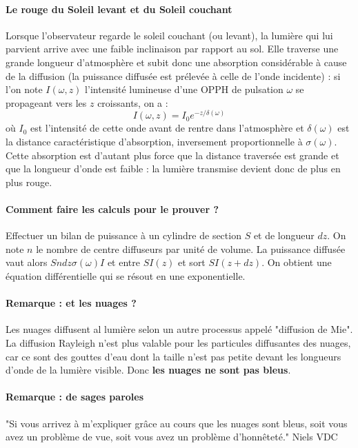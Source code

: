 \documentclass[french]{book}
\theoremstyle{plain}
\theoremstyle{definition}
\theoremstyle{remark}
\begin{document}
\paragraph{Le rouge du Soleil levant et du Soleil couchant}Lorsque l'observateur regarde le soleil couchant (ou levant), la lumière qui lui parvient arrive avec une faible inclinaison par rapport au sol. Elle traverse une grande longueur d'atmosphère et subit donc une absorption considérable à cause de la diffusion (la puissance diffusée est prélevée à celle de l'onde incidente) : si l'on note $I(\omega,z)$ l'intensité lumineuse d'une OPPH de pulsation $\omega$ se propageant vers les $z$ croissants, on a : $$I(\omega,z)=I_0e^{-z/\delta(\omega)}$$ où $I_0$ est l'intensité de cette onde avant de rentre dans l'atmosphère et $\delta(\omega)$ est la distance caractéristique d'absorption, inversement proportionnelle à $\sigma(\omega)$. Cette absorption est d'autant plus force que la distance traversée est grande et que la longueur d'onde est faible : la lumière transmise devient donc de plus en plus rouge.
\paragraph{Comment faire les calculs pour le prouver ?} Effectuer un bilan de puissance à un cylindre de section $S$ et de longueur $dz$. On note $n$ le nombre de centre diffuseurs par unité de volume. La puissance diffusée vaut alors $Sndz\sigma(\omega)I$ et entre $SI(z)$ et sort $SI(z+dz)$. On obtient une équation différentielle qui se résout en une exponentielle.
\paragraph{Remarque : et les nuages ?} Les nuages diffusent al lumière selon un autre processus appelé "diffusion de Mie". La diffusion Rayleigh n'est plus valable pour les particules diffusantes des nuages, car ce sont des gouttes d'eau dont la taille n'est pas petite devant les longueurs d'onde de la lumière visible. Donc \textbf{les nuages ne sont pas bleus}.
\paragraph{Remarque : de sages paroles}"Si vous arrivez à m'expliquer grâce au cours que les nuages sont bleus, soit vous avez un problème de vue, soit vous avez un problème d'honnêteté." Niels VDC
\end{document}
